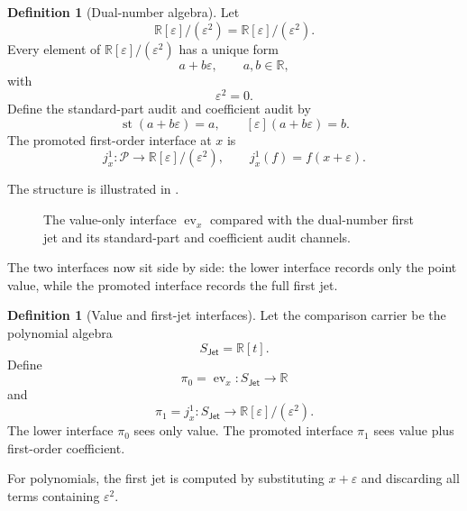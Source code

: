 \documentclass[11pt]{article}
\newcommand{\R}{\mathbb R}
\newcommand{\Dual}{\R[\varepsilon]/(\varepsilon^2)}
\newcommand{\Jet}{\mathsf{Jet}}
\newcommand{\ev}{\operatorname{ev}}
\newcommand{\st}{\operatorname{st}}
\theoremstyle{definition}
\newtheorem{definition}[theorem]{Definition}
\begin{document}
\begin{definition}[Dual-number algebra]
\label{def:jet-dual-number-algebra}
Let
\[
\Dual=\mathbb R[\varepsilon]/(\varepsilon^2).
\]
Every element of \(\Dual\) has a unique form
\[
a+b\varepsilon,
\qquad
 a,b\in\mathbb R,
\]
with
\[
\varepsilon^2=0.
\]
Define the standard-part audit and coefficient audit by
\[
\st(a+b\varepsilon)=a,
\qquad
[\varepsilon](a+b\varepsilon)=b.
\]
The promoted first-order interface at \(x\) is
\[
j_x^1:\mathcal P\to\Dual,
\qquad
j_x^1(f)=f(x+\varepsilon).
\]
\end{definition}

The structure is illustrated in .
\begingroup\begin{figure}[tbp]
\centering
{}
\caption{The value-only interface \(\ev_x\) compared with the dual-number first jet and its standard-part and coefficient audit channels.}
\label{fig:dual-jet}
\end{figure}
 \endgroup

The two interfaces now sit side by side: the lower interface records only the
point value, while the promoted interface records the full first jet.

\begin{definition}[Value and first-jet interfaces]
\label{def:jet-interfaces}
Let the comparison carrier be the polynomial algebra
\[
S_{\Jet}=\mathbb R[t].
\]
Define
\[
\pi_0=\ev_x:S_{\Jet}\to\mathbb R
\]
and
\[
\pi_1=j_x^1:S_{\Jet}\to\Dual.
\]
The lower interface \(\pi_0\) sees only value.  The promoted interface \(\pi_1\) sees value plus first-order coefficient.
\end{definition}

For polynomials, the first jet is computed by substituting \(x+\varepsilon\)
and discarding all terms containing \(\varepsilon^2\).
\end{document}
